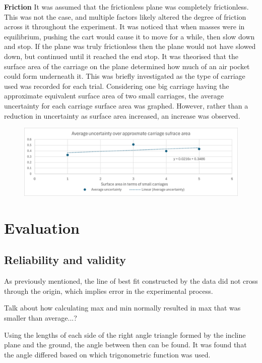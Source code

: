 \documentclass[11pt,a4paper]{article}
\begin{document}
\textbf{Friction}\newline
It was assumed that the frictionless plane was completely frictionless. This was not the case, and multiple factors likely altered the degree of friction across it throughout the experiment. 
It was noticed that when masses were in equilibrium, pushing the cart would cause it to move for a while, then slow down and stop. If the plane was truly frictionless then the plane would not have slowed down, but continued until it reached the end stop. It was theorised that the surface area of the carriage on the plane determined how much of an air pocket could form underneath it. This was briefly investigated as the type of carriage used was recorded for each trial. Considering one big carriage having the approximate equivalent surface area of two small carriages, the average uncertainty for each carriage surface area was graphed. However, rather than a reduction in uncertainty as surface area increased, an increase was observed. 
\begin{figure}[h]
	\centering
	\includegraphics[width=0.7\paperwidth]{./images/ApproxCarriage.png}
	
\end{figure}


\section{Evaluation}

\subsection{Reliability and validity}

As previously mentioned, the line of best fit constructed by the data did not cross through the origin, which implies error in the experimental process.

Talk about how calculating max and min normally resulted in max that was smaller than average...?

Using the lengths of each side of the right angle triangle formed by the incline plane and the ground, the angle between then can be found. It was found that the angle differed based on which trigonometric function was used. 
 
\end{document}
